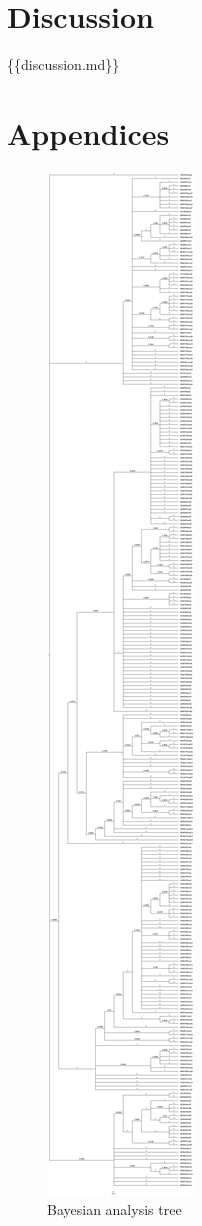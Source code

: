\part{Discussion}
\label{discussion}

\{\{discussion.md\}\}

\part{Appendices}
\label{appendices}

\begin{figure}[htbp]
\centering
\includegraphics[keepaspectratio,width=\textwidth,height=0.75\textheight]{images/mcmc.jpg}
\caption{Bayesian analysis tree}
\end{figure}

